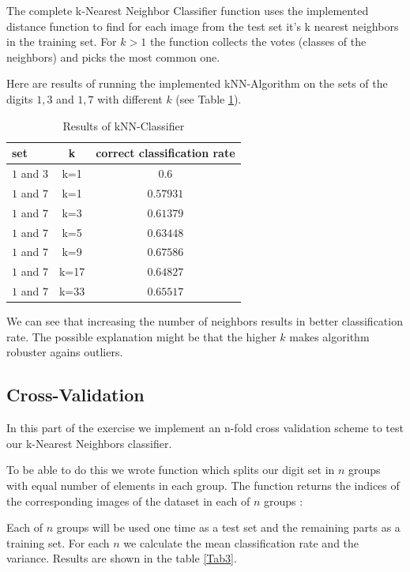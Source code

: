 \documentclass{article}
\begin{document}
The complete k-Nearest Neighbor Classifier function uses the implemented distance function to find for each image from the test set it's k nearest neighbors in the training set. For $k>1$ the function collects the votes (classes of the neighbors) and picks the most common one.



Here are results of running the implemented kNN-Algorithm on the sets of the digits $1, 3$ and $1,7$ with different $k$ (see Table \ref{Tab2}).

\begin{table}[htb]
	\centering
	\begin{tabular}{|l|c|c|}
		\hline
		set & k & correct classification rate\\ \hline
		$1$ and $3$ & k=1 & $0.6$\\ \hline
		$1$ and $7$ & k=1 & $0.57931$\\ 
		$1$ and $7$ & k=3 & $0.61379$\\ 
		$1$ and $7$ & k=5 & $0.63448$\\ 
		$1$ and $7$ & k=9 & $0.67586$\\ 
		$1$ and $7$ & k=17 & $0.64827$ \\ 						
		$1$ and $7$ & k=33 & $0.65517$\\ \hline		
	\end{tabular}
\caption{Results of kNN-Classifier}
\label{Tab2}
\end{table}

We can see that increasing the number of neighbors results in better classification rate. The possible explanation might be that the higher $k$ makes algorithm robuster agains outliers. 

\subsection{Cross-Validation}
 In this part of the exercise we implement an n-fold cross validation scheme to test our k-Nearest Neighbors classifier.

To be able to do this we wrote function which splits our digit set in $n$ groups with equal number of elements in each group.
The function returns the indices of the corresponding images of the dataset in each of $n$ groups :
 


Each of $n$ groups will be used one time as a test set and the remaining parts as a training set. For each $n$ we calculate the mean classification rate and the variance. Results are shown in the table \ref{Tab3}.
\end{document}
